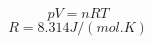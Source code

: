 \documentclass[10pt,a4paper]{article}
\begin{document}
$$ pV = nRT $$
$$ R = 8.314 J / (mol. K) $$
\end{document}
